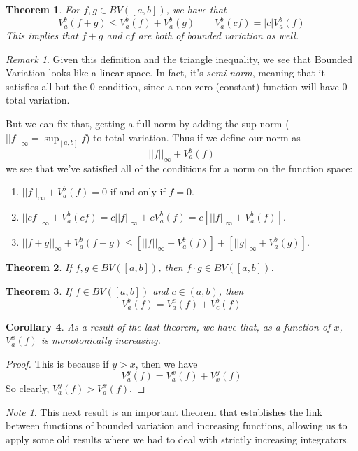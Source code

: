 \documentclass[12pt]{article}
\theoremstyle{plain}
\newtheorem{thm}{Theorem}[subsection]
\newtheorem{cor}[thm]{Corollary}
\theoremstyle{definition}
\theoremstyle{remark}
\newtheorem*{rmk}{Remark}
\newtheorem*{note}{Note}
\begin{document}
\begin{thm}
For $f, g\in BV([a,b])$, we have that
    \[ V_a^b(f+g) \leq V_a^b(f) + V_a^b(g)
    \qquad V_a^b(cf) = |c|V_a^b(f) \]
This implies that $f+g$ and $cf$ are both of bounded variation as well.
\end{thm}
\begin{rmk}
Given this definition and the triangle inequality, we see that Bounded Variation looks like a linear space. In fact, it's \emph{semi-norm}, meaning that it satisfies all but the 0 condition, since a non-zero (constant) function will have 0 total variation. 

But we can fix that, getting a full norm by adding the sup-norm ($||f||_\infty = \sup_[a,b] f$) to total variation. Thus if we define our norm as
    \[ ||f||_\infty + V_a^b(f) \]
we see that we've satisfied all of the conditions for a norm on the function space:
\begin{enumerate}
    \item $||f||_\infty + V_a^b(f) = 0$ if and only if $f=0$.
    \item $||cf||_\infty + V_a^b(cf) = c||f||_\infty + cV_a^b(f)
        = c\left[||f||_\infty + V_a^b(f)\right]$.
    \item $||f+g||_\infty + V_a^b(f+g) \leq 
        \left[||f||_\infty + V_a^b(f)\right] +
        \left[||g||_\infty + V_a^b(g)\right]$.
\end{enumerate}
\end{rmk}

\begin{thm}
If $f,g\in BV([a,b])$, then $f\cdot g \in BV([a,b])$.
\end{thm}

\begin{thm}
If $f\in BV([a,b])$ and $c \in (a,b)$, then 
    \[ V_a^b(f) = V_a^c(f) + V_c^b(f) \]
\end{thm}
\begin{cor}
As a result of the last theorem, we have that, as a function of $x$, $V_a^x(f)$ is monotonically increasing.
\end{cor}
\begin{proof}
This is because if $y>x$, then we have 
    \[ V_a^y(f) = V_a^x(f) + V_x^y(f) \]
So clearly, $V_a^y(f) >V_a^x(f)$.
\end{proof}

\begin{note}
This next result is an important theorem that establishes the link between functions of bounded variation and increasing functions, allowing us to apply some old results where we had to deal with strictly increasing integrators.
\end{note}
\end{document}
